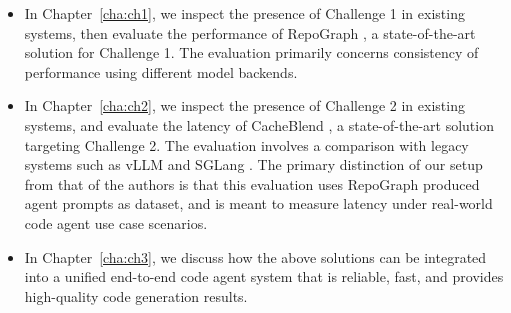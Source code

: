 \vspace{0.1in}
\begin{itemize}
    \item In Chapter~\ref{cha:ch1}, we inspect the presence of Challenge 1 in existing systems, then evaluate the performance of RepoGraph \cite{ouyang2025repographenhancingaisoftware}, a state-of-the-art solution for Challenge 1. The evaluation primarily concerns consistency of performance using different model backends.
    \item In Chapter~\ref{cha:ch2}, we inspect the presence of Challenge 2 in existing systems, and evaluate the latency of CacheBlend \cite{yao2025cacheblendfastlargelanguage}, a state-of-the-art solution targeting Challenge 2. The evaluation involves a comparison with legacy systems such as vLLM and SGLang \cite{kwon2023vllm, zheng2024sglangefficientexecutionstructured}. The primary distinction of our setup from that of the authors is that this evaluation uses RepoGraph produced agent prompts as dataset, and is meant to measure latency under real-world code agent use case scenarios. 
    \item In Chapter~\ref{cha:ch3}, we discuss how the above solutions can be integrated into a unified end-to-end code agent system that is reliable, fast, and provides high-quality code generation results. 
\end{itemize}
